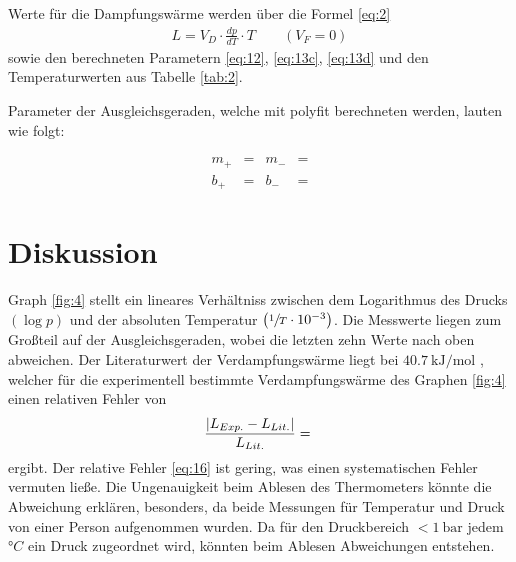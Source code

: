 \justifying Werte für die Dampfungswärme werden über die Formel \eqref{eq:2}  
\begin{align}
    L= V_D \cdot \frac{dp}{dT}\cdot T \qquad (V_F = 0) \label{eq:14}
\end{align}
sowie den berechneten Parametern \eqref{eq:12}, \eqref{eq:13c}, \eqref{eq:13d} und den Temperaturwerten aus Tabelle \ref{tab:2}.

\justifying Parameter der Ausgleichsgeraden, welche mit polyfit \cite{numpy} berechneten werden, lauten wie folgt:

\begin{subequations} \label{eq:15}
\begin{align}
    m_{+} &= \text{}  &m_{-} &=\text{}  \label{eq:15a}\\
    b_{+} &= \text{} &b_{-} &= \text{}  \label{eq:15b}
\end{align}
\end{subequations}
\newpage


\section{Diskussion}

\justifying Graph \ref{fig:4} stellt ein lineares Verhältniss zwischen dem Logarithmus des Drucks $\left( \log{p} \right)$ und 
der absoluten Temperatur $\left( \sfrac{1}{T} \cdot 10^{-3} \right)$. Die Messwerte liegen zum Großteil auf der Ausgleichsgeraden, wobei die letzten 
zehn Werte nach oben abweichen. Der Literaturwert der Verdampfungswärme liegt bei $\SI{40.7}{\kilo\joule\per\mole}$ \cite{Verdampfungswärme}, welcher
für die experimentell bestimmte Verdampfungswärme des Graphen \ref{fig:4} einen relativen Fehler von
\begin{equation}
    \frac{\lvert L_{Exp.} - L_{Lit.}\rvert}{L_{Lit.}} = \text{} \label{eq:16}
\end{equation}
ergibt. Der relative Fehler \eqref{eq:16} ist gering, was einen systematischen Fehler vermuten ließe. Die Ungenauigkeit beim Ablesen des Thermometers
könnte die Abweichung erklären, besonders, da beide Messungen für Temperatur und Druck von einer Person aufgenommen wurden. Da für den Druckbereich
$< \SI{1}{\bar}$ jedem $°C$ ein Druck zugeordnet wird, könnten beim Ablesen Abweichungen entstehen.

